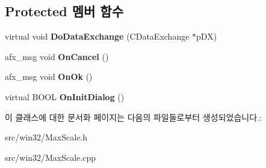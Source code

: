 \subsection*{Protected 멤버 함수}
\begin{DoxyCompactItemize}
\item 
\mbox{\label{class_max_scale_a662145e5302d2f9ecf0beb9cb59badf6}} 
virtual void {\bfseries Do\+Data\+Exchange} (C\+Data\+Exchange $\ast$p\+DX)
\item 
\mbox{\label{class_max_scale_a2adeba2f4a8d4371f8c8f301a44c0b3b}} 
afx\+\_\+msg void {\bfseries On\+Cancel} ()
\item 
\mbox{\label{class_max_scale_a3769f394432ad37e3d631434333d6141}} 
afx\+\_\+msg void {\bfseries On\+Ok} ()
\item 
\mbox{\label{class_max_scale_a7d3d960c9c4846d318a878dec66cf8c5}} 
virtual B\+O\+OL {\bfseries On\+Init\+Dialog} ()
\end{DoxyCompactItemize}


이 클래스에 대한 문서화 페이지는 다음의 파일들로부터 생성되었습니다.\+:\begin{DoxyCompactItemize}
\item 
src/win32/Max\+Scale.\+h\item 
src/win32/Max\+Scale.\+cpp\end{DoxyCompactItemize}
